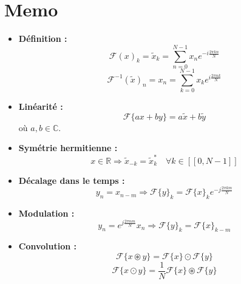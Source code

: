 \documentclass[11pt,oneside]{article}
\begin{document}
\section{Memo}


\begin{tcolorbox}[title=Mémo, colframe=cyan!75!black, colback=yellow!5!white, coltitle=black]
\begin{itemize}
    \item \textbf{Définition :} 
    $$\mathcal{F}(x)_k = \tilde x_k = \sum_{n=0}^{N-1} x_n e^{-i\frac{2 \pi k n}{N}}$$
    $$\mathcal{F}^{-1}(\tilde x)_n = x_n = \sum_{k=0}^{N-1} x_k e^{i\frac{2 \pi n k}{N}}$$
    \item \textbf{Linéarité :} 
    $$\mathcal{F}\{a x + b y\} = a \tilde{x} + b \tilde{y}$$ 
    où $a, b \in \mathbb{C}$.
    \item \textbf{Symétrie hermitienne :} 
    $$x \in \mathbb{R} \Rightarrow \tilde{x}_{-k} = \tilde{x}_k^* \quad \forall k \in [\![0,N-1]\!]$$
    \item \textbf{Décalage dans le temps :} 
    $$y_n = x_{n-m} \Rightarrow \mathcal{F}\{y\}_k = \mathcal{F}\{x\}_k e^{-j \frac{2\pi k m}{N}}$$
    \item \textbf{Modulation :} 
    $$y_n = e^{j \frac{2\pi n m}{N}} x_n \Rightarrow \mathcal{F}\{y\}_k = \mathcal{F}\{x\}_{k-m}$$
     \item \textbf{Convolution :} 
    $$\mathcal{F}\{x \circledast y \} = \mathcal{F} \{x\} \odot \mathcal{F} \{y\}$$
    $$\mathcal{F}\{x \odot y \} = \frac{1}{N} \mathcal{F} \{x\} \circledast \mathcal{F} \{y\}$$
    
\end{itemize}
\end{tcolorbox}



\nocite{*} %
\printbibliography
\end{document}
